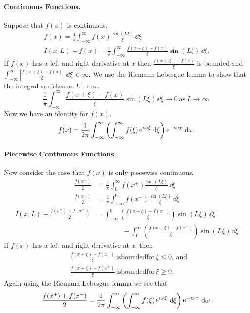 \paragraph{Continuous Functions.}
Suppose that $f(x)$ is continuous.
\begin{gather*}
  f(x) = \frac{1}{\pi} \int_{-\infty}^\infty f(x) \frac{\sin(L \xi)}{\xi} \,\dd \xi 
  \\
  I(x, L) - f(x) = \frac{1}{\pi} \int_{-\infty}^\infty \frac{f(x+\xi)-f(x)}{\xi} \sin(L \xi)\,\dd \xi.
\end{gather*}
If $f(x)$ has a left and right derivative at $x$ then 
$\frac{f(x+\xi)-f(x)}{\xi}$ is bounded and 
$\int_{-\infty}^\infty \left| \frac{f(x+\xi)-f(x)}{\xi} \right|\,\dd \xi < \infty$.  
We use the Riemann-Lebesgue lemma to show that the integral vanishes as 
$L \to \infty$.
\[ 
\frac{1}{\pi} \int_{-\infty}^\infty \frac{f(x+\xi)-f(x)}{\xi} 
\sin(L \xi)\,\dd \xi \to 0\ \mathrm{as}\ L \to \infty.
\]
Now we have an identity for $f(x)$. 
\[ 
f(x) = \frac{1}{2\pi} \int_{-\infty}^\infty \left( \int_{-\infty}^\infty 
  f(\xi) \mathop{\mathrm{e}}\nolimits^{\imath \omega \xi}\,\mathrm{d} \xi \right) \mathop{\mathrm{e}}\nolimits^{-\imath \omega x}\,\mathrm{d} \omega.
\]


\paragraph{Piecewise Continuous Functions.}
Now consider the case that $f(x)$ is only piecewise continuous.
\begin{align*}
  \frac{f(x^+)}{2} &= \frac{1}{\pi} \int_0^\infty f(x^+) \frac{\sin(L \xi)}{\xi} \,\dd \xi 
  \\
  \frac{f(x^-)}{2} &= \frac{1}{\pi} \int_{-\infty}^0 f(x^-)\frac{\sin(L \xi)}{\xi}  \,\dd \xi 
\end{align*}
\begin{align*}
  I(x,L) - \frac{f(x^+) + f(x^-)}{2} 
  &= \int_{-\infty}^0 \left( \frac{f(x+\xi)-f(x^-)}{\xi} \right) \sin(L \xi)\,\dd \xi 
  \\
  &\qquad \qquad - \int_0^\infty \left( \frac{f(x+\xi)-f(x^+)}{\xi} \right) \sin(L \xi)\,\dd \xi
\end{align*}
If $f(x)$ has a left and right derivative at $x$, then 
\begin{align*}
  &\frac{f(x+\xi)-f(x^-)}{\xi}\ \mathrm{is bounded for}\ \xi \leq 0,\ \mathrm{and}\  
  \\
  &\frac{f(x+\xi)-f(x^+)}{\xi}\ \mathrm{is bounded for}\ \xi \geq 0.
\end{align*}
Again using the Riemann-Lebesgue lemma we see that
\[ 
\frac{f(x^+) + f(x^-)}{2} = \frac{1}{2\pi} \int_{-\infty}^\infty \left( \int_{-\infty}^\infty
  f(\xi) \mathop{\mathrm{e}}\nolimits^{\imath \omega \xi}\,\mathrm{d} \xi \right) \mathop{\mathrm{e}}\nolimits^{-\imath \omega x}\,\mathrm{d} \omega.
\]




